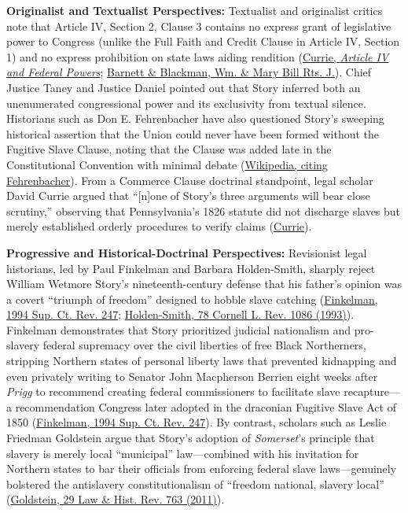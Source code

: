 \documentclass[12pt]{article}
\begin{document}
\textbf{Originalist and Textualist Perspectives:} Textualist and originalist critics note that Article IV, Section 2, Clause 3 contains no express grant of legislative power to Congress (unlike the Full Faith and Credit Clause in Article IV, Section 1) and no express prohibition on state laws aiding rendition (\href{https://chicagounbound.uchicago.edu/cgi/viewcontent.cgi?article=6111&context=journal_articles}{Currie, \textit{Article IV and Federal Powers}}; \href{https://scholarship.law.wm.edu/cgi/viewcontent.cgi?article=2141&context=wmborj}{Barnett \& Blackman, Wm. \& Mary Bill Rts. J.}). Chief Justice Taney and Justice Daniel pointed out that Story inferred both an unenumerated congressional power and its exclusivity from textual silence. Historians such as Don E. Fehrenbacher have also questioned Story's sweeping historical assertion that the Union could never have been formed without the Fugitive Slave Clause, noting that the Clause was added late in the Constitutional Convention with minimal debate (\href{https://en.wikipedia.org/wiki/Prigg_v._Pennsylvania}{Wikipedia, citing Fehrenbacher}). From a Commerce Clause doctrinal standpoint, legal scholar David Currie argued that ``[n]one of Story's three arguments will bear close scrutiny,'' observing that Pennsylvania's 1826 statute did not discharge slaves but merely established orderly procedures to verify claims (\href{https://chicagounbound.uchicago.edu/cgi/viewcontent.cgi?article=6111&context=journal_articles}{Currie}).

\textbf{Progressive and Historical-Doctrinal Perspectives:} Revisionist legal historians, led by Paul Finkelman and Barbara Holden-Smith, sharply reject William Wetmore Story's nineteenth-century defense that his father's opinion was a covert ``triumph of freedom'' designed to hobble slave catching (\href{https://chicagounbound.uchicago.edu/supremecourtrev/vol1994/iss1/7/}{Finkelman, 1994 Sup. Ct. Rev. 247}; \href{https://scholarship.law.cornell.edu/clr/vol78/iss6/2/}{Holden-Smith, 78 Cornell L. Rev. 1086 (1993)}). Finkelman demonstrates that Story prioritized judicial nationalism and pro-slavery federal supremacy over the civil liberties of free Black Northerners, stripping Northern states of personal liberty laws that prevented kidnapping and even privately writing to Senator John Macpherson Berrien eight weeks after \textit{Prigg} to recommend creating federal commissioners to facilitate slave recapture---a recommendation Congress later adopted in the draconian Fugitive Slave Act of 1850 (\href{https://msa.maryland.gov/megafile/msa/speccol/sc5400/sc5496/051200/051268/images/finkelman_story.pdf}{Finkelman, 1994 Sup. Ct. Rev. 247}). By contrast, scholars such as Leslie Friedman Goldstein argue that Story's adoption of \textit{Somerset}'s principle that slavery is merely local ``municipal'' law---combined with his invitation for Northern states to bar their officials from enforcing federal slave laws---genuinely bolstered the antislavery constitutionalism of ``freedom national, slavery local'' (\href{https://www.cambridge.org/core/journals/law-and-history-review/article/triumph-of-freedom-after-all-prigg-v-pennsylvania-reexamined/A0B7452002A367E4EFE865A3375F9D0E}{Goldstein, 29 Law \& Hist. Rev. 763 (2011)}).
\end{document}
